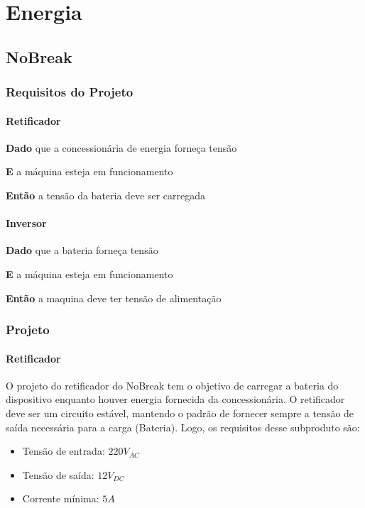 \chapter[Energia]{Energia}
\section[NoBreak]{NoBreak}
\subsection[Requisitos do Projeto]{Requisitos do Projeto}
    \subsubsection[Retificador]{Retificador}
        \textbf{Dado} que a concessionária de energia forneça tensão
        
        \textbf{E} a máquina esteja em funcionamento
        
        \textbf{Então} a tensão da bateria deve ser carregada 
        
    \subsubsection[Inversor]{Inversor}
        \textbf{Dado} que a bateria forneça tensão
        
        \textbf{E} a máquina esteja em funcionamento
        
        \textbf{Então} a maquina deve ter tensão de alimentação
        
\subsection[Projeto]{Projeto}     
    \subsubsection[Retificador]{Retificador}            
        O projeto do retificador do NoBreak tem o objetivo de carregar a bateria do 					dispositivo enquanto houver energia fornecida da concessionária. O retificador 				deve ser um circuito estável, mantendo o padrão de fornecer sempre a tensão de 				saída necessária para a carga (Bateria). Logo, os requisitos desse subproduto 					são:

        \begin{itemize}
            \item Tensão de entrada: $220V_{AC}$
            \item Tensão de saída: $12V_{DC}$
            \item Corrente mínima: $5A$
        \end{itemize}

